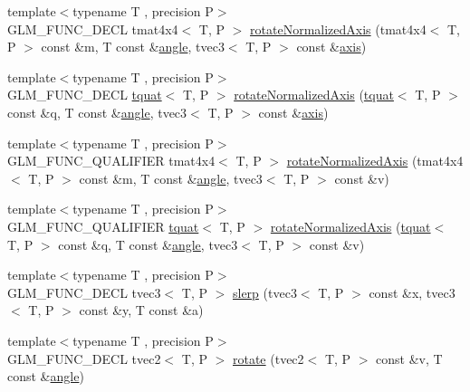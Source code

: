 \begin{DoxyCompactItemize}
\item 
{\footnotesize template$<$typename T , precision P$>$ }\\G\+L\+M\+\_\+\+F\+U\+N\+C\+\_\+\+D\+E\+C\+L tmat4x4$<$ T, P $>$ \hyperlink{group__gtx__rotate__normalized__axis_gaada623964a895def5a8b77b5b7887dc4}{rotate\+Normalized\+Axis} (tmat4x4$<$ T, P $>$ const \&m, T const \&\hyperlink{group__gtc__quaternion_gad4a4448baedb198b2b1e7880d2544dc9}{angle}, tvec3$<$ T, P $>$ const \&\hyperlink{group__gtc__quaternion_ga0b3e87a13b2708154b72259e50789a19}{axis})
\item 
{\footnotesize template$<$typename T , precision P$>$ }\\G\+L\+M\+\_\+\+F\+U\+N\+C\+\_\+\+D\+E\+C\+L \hyperlink{structglm_1_1tquat}{tquat}$<$ T, P $>$ \hyperlink{group__gtx__rotate__normalized__axis_ga6c00234d844faef36a6a94669fbd1639}{rotate\+Normalized\+Axis} (\hyperlink{structglm_1_1tquat}{tquat}$<$ T, P $>$ const \&q, T const \&\hyperlink{group__gtc__quaternion_gad4a4448baedb198b2b1e7880d2544dc9}{angle}, tvec3$<$ T, P $>$ const \&\hyperlink{group__gtc__quaternion_ga0b3e87a13b2708154b72259e50789a19}{axis})
\item 
{\footnotesize template$<$typename T , precision P$>$ }\\G\+L\+M\+\_\+\+F\+U\+N\+C\+\_\+\+Q\+U\+A\+L\+I\+F\+I\+E\+R tmat4x4$<$ T, P $>$ \hyperlink{group__gtx__rotate__normalized__axis_gaada623964a895def5a8b77b5b7887dc4}{rotate\+Normalized\+Axis} (tmat4x4$<$ T, P $>$ const \&m, T const \&\hyperlink{group__gtc__quaternion_gad4a4448baedb198b2b1e7880d2544dc9}{angle}, tvec3$<$ T, P $>$ const \&v)
\item 
{\footnotesize template$<$typename T , precision P$>$ }\\G\+L\+M\+\_\+\+F\+U\+N\+C\+\_\+\+Q\+U\+A\+L\+I\+F\+I\+E\+R \hyperlink{structglm_1_1tquat}{tquat}$<$ T, P $>$ \hyperlink{group__gtx__rotate__normalized__axis_ga6c00234d844faef36a6a94669fbd1639}{rotate\+Normalized\+Axis} (\hyperlink{structglm_1_1tquat}{tquat}$<$ T, P $>$ const \&q, T const \&\hyperlink{group__gtc__quaternion_gad4a4448baedb198b2b1e7880d2544dc9}{angle}, tvec3$<$ T, P $>$ const \&v)
\item 
{\footnotesize template$<$typename T , precision P$>$ }\\G\+L\+M\+\_\+\+F\+U\+N\+C\+\_\+\+D\+E\+C\+L tvec3$<$ T, P $>$ \hyperlink{group__gtx__rotate__vector_gafc9ab3101c3f3799f3d5d6d9d3baac09}{slerp} (tvec3$<$ T, P $>$ const \&x, tvec3$<$ T, P $>$ const \&y, T const \&a)
\item 
{\footnotesize template$<$typename T , precision P$>$ }\\G\+L\+M\+\_\+\+F\+U\+N\+C\+\_\+\+D\+E\+C\+L tvec2$<$ T, P $>$ \hyperlink{group__gtx__rotate__vector_ga9bff444fb191e2e089a906b899cd033d}{rotate} (tvec2$<$ T, P $>$ const \&v, T const \&\hyperlink{group__gtc__quaternion_gad4a4448baedb198b2b1e7880d2544dc9}{angle})

\end{DoxyCompactItemize}
